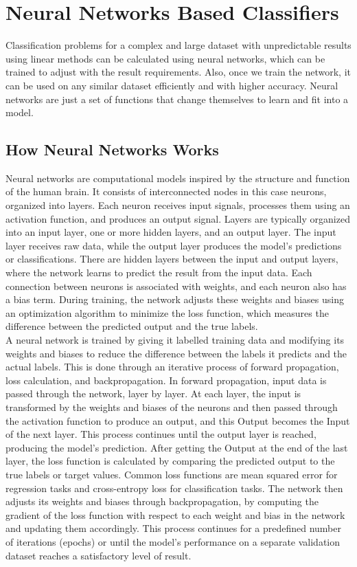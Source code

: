 \chapter{Neural Networks Based Classifiers}

Classification problems for a complex and large dataset with unpredictable results using linear methods can be calculated using neural networks, which can be trained to adjust with the result requirements. Also, once we train the network, it can be used on any similar dataset efficiently and with higher accuracy. Neural networks are just a set of functions that change themselves to learn and fit into a model. 

\section{How Neural Networks Works}
Neural networks are computational models inspired by the structure and function of the human brain. It consists of interconnected nodes in this case neurons, organized into layers. Each neuron receives input signals, processes them using an activation function, and produces an output signal. Layers are typically organized into an input layer, one or more hidden layers, and an output layer. The input layer receives raw data, while the output layer produces the model's predictions or classifications. There are hidden layers between the input and output layers, where the network learns to predict the result from the input data. Each connection between neurons is associated with weights, and each neuron also has a bias term. During training, the network adjusts these weights and biases using an optimization algorithm to minimize the loss function, which measures the difference between the predicted output and the true labels.\\
A neural network is trained by giving it labelled training data and modifying its weights and biases to reduce the difference between the labels it predicts and the actual labels. This is done through an iterative process of forward propagation, loss calculation, and backpropagation. In forward propagation, input data is passed through the network, layer by layer. At each layer, the input is transformed by the weights and biases of the neurons and then passed through the activation function to produce an output, and this Output becomes the Input of the next layer. This process continues until the output layer is reached, producing the model's prediction.
After getting the Output at the end of the last layer, the loss function is calculated by comparing the predicted output to the true labels or target values. Common loss functions are mean squared error for regression tasks and cross-entropy loss for classification tasks. The network then adjusts its weights and biases through backpropagation, by computing the gradient of the loss function with respect to each weight and bias in the network and updating them accordingly. This process continues for a predefined number of iterations (epochs) or until the model's performance on a separate validation dataset reaches a satisfactory level of result.

